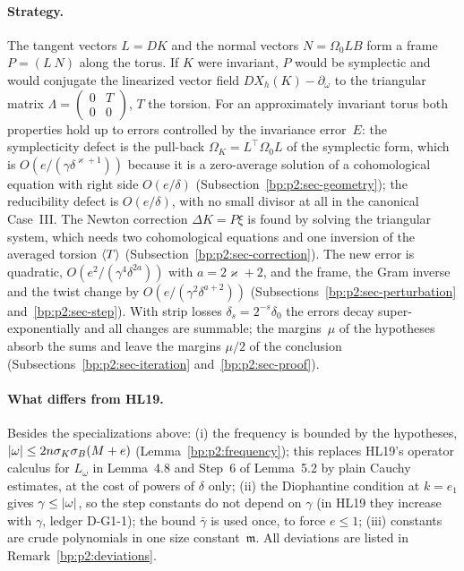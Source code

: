\paragraph{Strategy.} The tangent vectors $L=DK$ and the normal vectors $N=\Omega_0LB$ form a frame
$P=(L\ N)$ along the torus. If $K$ were invariant, $P$ would be symplectic and would conjugate the
linearized vector field $DX_h(K)-\partial_\omega$ to the triangular matrix
$\Lambda=\left(\begin{smallmatrix}0&T\\0&0\end{smallmatrix}\right)$, $T$ the torsion. For an
approximately invariant torus both properties hold up to errors controlled by the invariance error~$E$:
the symplecticity defect is the pull-back $\Omega_K=L^\top\Omega_0L$ of the symplectic form, which is
$O(e/(\gamma\delta^{\varkappa+1}))$ because it is a zero-average solution of a cohomological equation
with right side $O(e/\delta)$ (Subsection~\ref{bp:p2:sec-geometry}); the reducibility defect is
$O(e/\delta)$, with no small divisor at all in the canonical Case~III. The Newton correction
$\Delta K=P\xi$ is found by solving the triangular system, which needs two cohomological equations and
one inversion of the averaged torsion $\langle T\rangle$ (Subsection~\ref{bp:p2:sec-correction}). The new error
is quadratic, $O(e^2/(\gamma^4\delta^{2a}))$ with $a=2\varkappa+2$, and the frame, the Gram inverse and
the twist change by $O(e/(\gamma^2\delta^{a+2}))$ (Subsections~\ref{bp:p2:sec-perturbation}
and~\ref{bp:p2:sec-step}). With strip losses $\delta_s=2^{-s}\delta_0$ the errors decay
super-exponentially and all changes are summable; the margins~$\mu$ of the hypotheses absorb the sums
and leave the margins $\mu/2$ of the conclusion (Subsections~\ref{bp:p2:sec-iteration}
and~\ref{bp:p2:sec-proof}).

\paragraph{What differs from HL19.} Besides the specializations above: (i) the frequency is bounded by
the hypotheses, $\lvert \omega\rvert\le2n\sigma_K\sigma_B(M+e)$ (Lemma~\ref{bp:p2:frequency}); this replaces
HL19's operator calculus for $L_\omega$ in Lemma~4.8 and Step~6 of Lemma~5.2 by plain Cauchy estimates,
at the cost of powers of $\delta$ only; (ii) the Diophantine condition at $k=e_1$ gives
$\gamma\le\lvert \omega\rvert$, so the step constants do not depend on $\gamma$ (in HL19 they increase with
$\gamma$, ledger D-G1-1); the bound $\bar\gamma$ is used once, to force $e\le1$; (iii) constants are
crude polynomials in one size constant~$\mathfrak m$. All deviations are listed in
Remark~\ref{bp:p2:deviations}.

